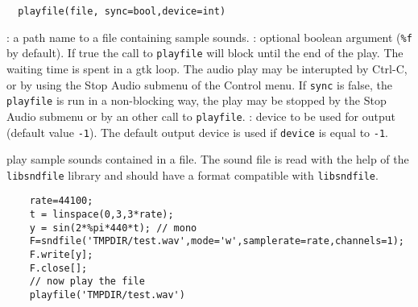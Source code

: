 
\begin{mandesc}
\end{mandesc}
\begin{calling_sequence}
\begin{verbatim}
  playfile(file, sync=bool,device=int)
\end{verbatim}
\end{calling_sequence}
\begin{parameters}
  \begin{varlist}
    : a path name to a file containing sample sounds. 
    : optional boolean argument (\verb+%f+ by default). 
    If true the call to \verb+playfile+ 
    will block until the end of the play. The waiting time is spent
    in a gtk loop. The audio play may be interupted by 
    Ctrl-C, or by using the Stop Audio submenu of the Control menu. 
    If \verb+sync+ is false, the \verb+playfile+ is run in a non-blocking way, the 
    play may be stopped by the  Stop Audio submenu or by an other call 
    to \verb+playfile+. 
   : device to be used for output (default value \verb+-1+). The default output 
   device is used if \verb+device+ is equal to \verb+-1+.
  \end{varlist}
\end{parameters}

\begin{mandescription}
  play sample sounds contained in a file. The sound file is read with 
  the help of the \verb+libsndfile+ library and should have a format compatible with 
  \verb+libsndfile+.
\end{mandescription}
\begin{examples}
  \begin{Verbatim}
    rate=44100;
    t = linspace(0,3,3*rate);
    y = sin(2*%pi*440*t); // mono 
    F=sndfile('TMPDIR/test.wav',mode='w',samplerate=rate,channels=1);
    F.write[y];
    F.close[];
    // now play the file 
    playfile('TMPDIR/test.wav')
  \end{Verbatim}
\end{examples}
\begin{manseealso}
\end{manseealso}

